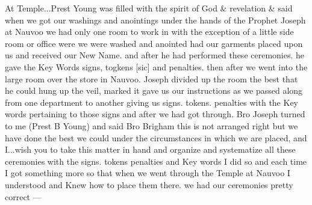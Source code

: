 					At Temple...Prest Young was filled with the spirit of God \& revelation \& said when we got our washings and anointings under the hands of the Prophet Joseph at Nauvoo we had only one room to work in with the exception of a little side room or office were we were washed and anointed had our garments placed upon us and received our New Name. and after he had performed these ceremonies. he gave the Key Words signs, togkens [sic] and penalties. then after we went into the large room over the store in Nauvoo. Joseph divided up the room the best that he could hung up the veil, marked it gave us our instructions as we passed along from one department to another giving us signs. tokens. penalties with the Key words pertaining to those signs and after we had got through. Bro Joseph turned to me (Prest B Young) and said Bro Brigham this is not arranged right but we have done the best we could under the circumstances in which we are placed, and I...wish you to take this matter in hand and organize and systematize all these ceremonies with the signs. tokens penalties and Key words I did so and each time I got something more so that when we went through the Temple at Nauvoo I understood and Knew how to place them there. we had our ceremonies pretty correct ---
		
